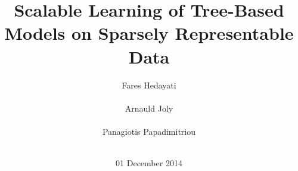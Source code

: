 \documentclass{acm_proc_article-sp}
\begin{document}
\title{Scalable Learning of Tree-Based Models on Sparsely Representable Data}

%
%
%
%
%

%
\author{
%
%
\alignauthor
Fares Hedayati\\
      \\
\alignauthor
Arnauld Joly\\
       \\
\alignauthor Panagiotis Papadimitriou\\
       \\
}
\date{01 December 2014}
\end{document}
